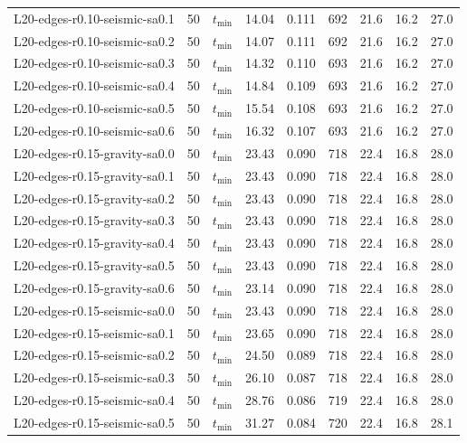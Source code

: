 \begin{tabular}{lrlrrrrrr}
L20-edges-r0.10-seismic-sa0.1 & 50 & $t_{\mathrm{min}}$ & 14.04 & 0.111 & 692 & 21.6 & 16.2 & 27.0 \\
L20-edges-r0.10-seismic-sa0.2 & 50 & $t_{\mathrm{min}}$ & 14.07 & 0.111 & 692 & 21.6 & 16.2 & 27.0 \\
L20-edges-r0.10-seismic-sa0.3 & 50 & $t_{\mathrm{min}}$ & 14.32 & 0.110 & 693 & 21.6 & 16.2 & 27.0 \\
L20-edges-r0.10-seismic-sa0.4 & 50 & $t_{\mathrm{min}}$ & 14.84 & 0.109 & 693 & 21.6 & 16.2 & 27.0 \\
L20-edges-r0.10-seismic-sa0.5 & 50 & $t_{\mathrm{min}}$ & 15.54 & 0.108 & 693 & 21.6 & 16.2 & 27.0 \\
L20-edges-r0.10-seismic-sa0.6 & 50 & $t_{\mathrm{min}}$ & 16.32 & 0.107 & 693 & 21.6 & 16.2 & 27.0 \\
L20-edges-r0.15-gravity-sa0.0 & 50 & $t_{\mathrm{min}}$ & 23.43 & 0.090 & 718 & 22.4 & 16.8 & 28.0 \\
L20-edges-r0.15-gravity-sa0.1 & 50 & $t_{\mathrm{min}}$ & 23.43 & 0.090 & 718 & 22.4 & 16.8 & 28.0 \\
L20-edges-r0.15-gravity-sa0.2 & 50 & $t_{\mathrm{min}}$ & 23.43 & 0.090 & 718 & 22.4 & 16.8 & 28.0 \\
L20-edges-r0.15-gravity-sa0.3 & 50 & $t_{\mathrm{min}}$ & 23.43 & 0.090 & 718 & 22.4 & 16.8 & 28.0 \\
L20-edges-r0.15-gravity-sa0.4 & 50 & $t_{\mathrm{min}}$ & 23.43 & 0.090 & 718 & 22.4 & 16.8 & 28.0 \\
L20-edges-r0.15-gravity-sa0.5 & 50 & $t_{\mathrm{min}}$ & 23.43 & 0.090 & 718 & 22.4 & 16.8 & 28.0 \\
L20-edges-r0.15-gravity-sa0.6 & 50 & $t_{\mathrm{min}}$ & 23.14 & 0.090 & 718 & 22.4 & 16.8 & 28.0 \\
L20-edges-r0.15-seismic-sa0.0 & 50 & $t_{\mathrm{min}}$ & 23.43 & 0.090 & 718 & 22.4 & 16.8 & 28.0 \\
L20-edges-r0.15-seismic-sa0.1 & 50 & $t_{\mathrm{min}}$ & 23.65 & 0.090 & 718 & 22.4 & 16.8 & 28.0 \\
L20-edges-r0.15-seismic-sa0.2 & 50 & $t_{\mathrm{min}}$ & 24.50 & 0.089 & 718 & 22.4 & 16.8 & 28.0 \\
L20-edges-r0.15-seismic-sa0.3 & 50 & $t_{\mathrm{min}}$ & 26.10 & 0.087 & 718 & 22.4 & 16.8 & 28.0 \\
L20-edges-r0.15-seismic-sa0.4 & 50 & $t_{\mathrm{min}}$ & 28.76 & 0.086 & 719 & 22.4 & 16.8 & 28.0 \\
L20-edges-r0.15-seismic-sa0.5 & 50 & $t_{\mathrm{min}}$ & 31.27 & 0.084 & 720 & 22.4 & 16.8 & 28.1 \\

\end{tabular}
